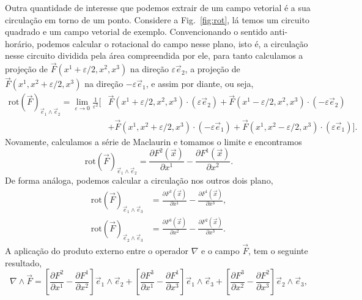 Outra quantidade de interesse que podemos extrair de um campo vetorial é a sua circulação em torno de um ponto. Considere a Fig.~\ref{fig:rot}, lá temos um circuito quadrado e um campo vetorial de exemplo. Convencionando o sentido anti-horário, podemos calcular o rotacional do campo nesse plano, isto é, a circulação nesse circuito dividida pela área compreendida por ele, para tanto calculamos a projeção de $\vec{F}(x^1+\varepsilon/2, x^2,x^3)$ na direção $\varepsilon\vec{e}_2$, a projeção de $\vec{F}(x^1, x^2+\varepsilon/2,x^3)$ na direção $-\varepsilon\vec{e}_1$, e assim por diante, ou seja,
\begin{equation}\label{limrot}
	\begin{split}
		\mathrm{rot}(\vec{F})_{\vec{e}_1\wedge\vec{e}_2} =\lim_{\varepsilon\to0}\frac{1}{\varepsilon^2}\Big[ & \vec{F}(x^1+\varepsilon/2, x^2,x^3)\cdot\left(\varepsilon\vec{e}_2\right) + \vec{F}(x^1-\varepsilon/2, x^2,x^3)\cdot\left(-\varepsilon\vec{e}_2\right)        \\
		                                                                                                     & +\vec{F}(x^1, x^2+\varepsilon/2,x^3)\cdot\left(-\varepsilon\vec{e}_1\right) + \vec{F}(x^1, x^2-\varepsilon/2,x^3)\cdot\left(\varepsilon\vec{e}_1\right)\Big].
	\end{split}
\end{equation}
Novamente, calculamos a série de Maclaurin e tomamos o limite e encontramos
\begin{equation}
	\mathrm{rot}(\vec{F})_{\vec{e}_1\wedge\vec{e}_2} = \frac{\partial F^2(\vec{x})}{\partial x^1} - \frac{\partial F^1(\vec{x})}{\partial x^2}.
\end{equation}
De forma análoga, podemos calcular a circulação nos outros dois plano,
\begin{align}
	\mathrm{rot}(\vec{F})_{\vec{e}_1\wedge\vec{e}_3} & = \frac{\partial F^3(\vec{x})}{\partial x^1} - \frac{\partial F^1(\vec{x})}{\partial x^3}, \\
	\mathrm{rot}(\vec{F})_{\vec{e}_2\wedge\vec{e}_3} & = \frac{\partial F^3(\vec{x})}{\partial x^2} - \frac{\partial F^2(\vec{x})}{\partial x^3}.
\end{align}
A aplicação do produto externo entre o operador $\nabla$ e o campo $\vec{F}$, tem o seguinte resultado,
\begin{equation}
	\nabla\wedge\vec{F} = \left[\frac{\partial F^2}{\partial x^1} - \frac{\partial F^1}{\partial x^2}\right]\vec{e}_1\wedge\vec{e}_2+\left[\frac{\partial F^3}{\partial x^1} - \frac{\partial F^1}{\partial x^3}\right]\vec{e}_1\wedge\vec{e}_3+\left[\frac{\partial F^3}{\partial x^2} - \frac{\partial F^2}{\partial x^3}\right]\vec{e}_2\wedge\vec{e}_3,
\end{equation}
